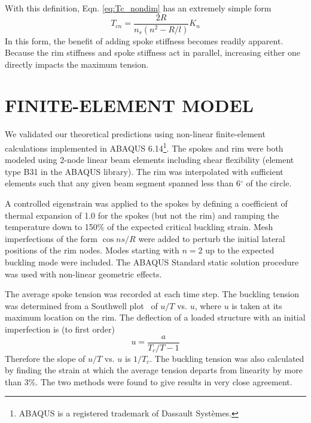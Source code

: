 \documentclass{bmd2016p}
\begin{document}
With this definition, Eqn. \ref{eq:Tc_nondim} has an extremely simple form
	\begin{equation}\label{eq:Tc_Kn}
	T_{cn} = \frac{2R}{n_s(n^2 - R/l)}K_n
	\end{equation}
In this form, the benefit of adding spoke stiffness becomes readily apparent. Because the rim stiffness and spoke stiffness act in parallel, increasing either one directly impacts the maximum tension.




\section{FINITE-ELEMENT MODEL}
We validated our theoretical predictions using non-linear finite-element calculations implemented in ABAQUS\textsuperscript{\textregistered} 6.14\footnote{ABAQUS\textsuperscript{\textregistered} is a registered trademark of Dassault Syst\`emes.}. The spokes and rim were both modeled using 2-node linear beam elements including shear flexibility (element type B31 in the ABAQUS library). The rim was interpolated with sufficient elements such that any given beam segment spanned less than 6$^{\circ}$ of the circle.

A controlled eigenstrain was applied to the spokes by defining a coefficient of thermal expansion of 1.0 for the spokes (but not the rim) and ramping the temperature down to 150\% of the expected critical buckling strain. Mesh imperfections of the form $\cos{ns/R}$ were added to perturb the initial lateral positions of the rim nodes. Modes starting with $n=2$ up to the expected buckling mode were included. The ABAQUS Standard static solution procedure was used with non-linear geometric effects.

The average spoke tension was recorded at each time step. The buckling tension was determined from a Southwell plot~\cite{Timoshenko1961a} of $u/T$ vs. $u$, where $u$ is taken at its maximum location on the rim. The deflection of a loaded structure with an initial imperfection is (to first order)
	\begin{equation}\label{eq:Southwell}
	u = \frac{a}{T_c/T - 1}
	\end{equation}
Therefore the slope of $u/T$ vs. $u$ is $1/T_c$. The buckling tension was also calculated by finding the strain at which the average tension departs from linearity by more than 3\%. The two methods were found to give results in very close agreement.
\end{document}
